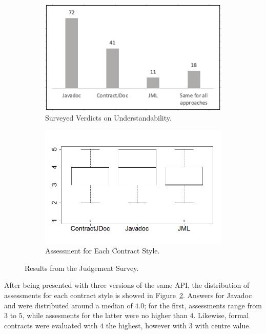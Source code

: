 \begin{figure}
\centering
\begin{subfigure}{.45\textwidth}
\includegraphics[width=1\linewidth]{figs/mostUnderstandable.png}
\caption{Surveyed Verdicts on Understandability.}
\label{fig:understand}
\end{subfigure}
\begin{subfigure}{.45\textwidth}
\includegraphics[width=1\linewidth]{figs/boxplotApproachesSurveyStudy}
\caption{Assessment for Each Contract Style.}
\label{fig:surveyResults}
\end{subfigure}
\caption{Results from the Judgement Survey.}
\label{fig:survey}
\end{figure}


After being presented with three versions of the same API, the distribution of assessments for each contract style is showed in Figure~\ref{fig:surveyResults}.
Answers for Javadoc and \contractjdoc{} were distributed around a median of $4.0$; for the first, assessments range from $3$ to $5$, while assesments for the latter were no higher than $4$.
Likewise, formal contracts were evaluated with $4$ the highest, however with $3$ with centre value. 

